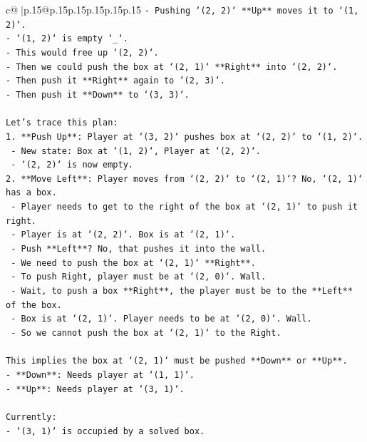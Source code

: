 \documentclass{article}
\begin{document}
{\begin{supertabular}{c@{$\;$}|p{.15\linewidth}@{}p{.15\linewidth}p{.15\linewidth}p{.15\linewidth}p{.15\linewidth}p{.15\linewidth}}
{{{\texttt{{-} Pushing `(2, 2)` **Up** moves it to `(1, 2)`.} \\
\texttt{{-} `(1, 2)` is empty `\_`.} \\
\texttt{{-} This would free up `(2, 2)`.} \\
\texttt{{-} Then we could push the box at `(2, 1)` **Right** into `(2, 2)`.} \\
\texttt{{-} Then push it **Right** again to `(2, 3)`.} \\
\texttt{{-} Then push it **Down** to `(3, 3)`.} \\
\\ 
\texttt{Let's trace this plan:} \\
\texttt{1. **Push Up**: Player at `(3, 2)` pushes box at `(2, 2)` to `(1, 2)`.} \\
\texttt{   {-} New state: Box at `(1, 2)`, Player at `(2, 2)`.} \\
\texttt{   {-} `(2, 2)` is now empty.} \\
\texttt{2. **Move Left**: Player moves from `(2, 2)` to `(2, 1)`? No, `(2, 1)` has a box.} \\
\texttt{   {-} Player needs to get to the right of the box at `(2, 1)` to push it right.} \\
\texttt{   {-} Player is at `(2, 2)`. Box is at `(2, 1)`.} \\
\texttt{   {-} Push **Left**? No, that pushes it into the wall.} \\
\texttt{   {-} We need to push the box at `(2, 1)` **Right**.} \\
\texttt{   {-} To push Right, player must be at `(2, 0)`. Wall.} \\
\texttt{   {-} Wait, to push a box **Right**, the player must be to the **Left** of the box.} \\
\texttt{   {-} Box is at `(2, 1)`. Player needs to be at `(2, 0)`. Wall.} \\
\texttt{   {-} So we cannot push the box at `(2, 1)` to the Right.} \\
\\ 
\texttt{This implies the box at `(2, 1)` must be pushed **Down** or **Up**.} \\
\texttt{{-} **Down**: Needs player at `(1, 1)`.} \\
\texttt{{-} **Up**: Needs player at `(3, 1)`.} \\
\\ 
\texttt{Currently:} \\
\texttt{{-} `(3, 1)` is occupied by a solved box.} \\
}}}
\end{supertabular}}
\end{document}
